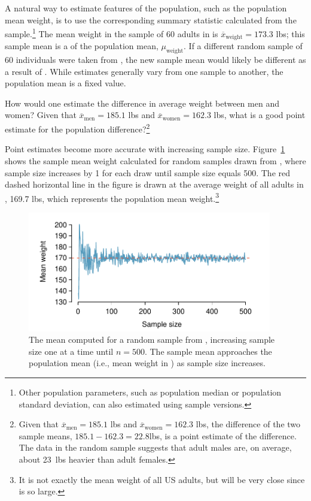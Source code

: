 A natural way to estimate features of the population, such as the population mean weight, is to use the corresponding summary statistic calculated from the sample.\footnote{Other population parameters, such as population median or population standard deviation, can also estimated using sample versions.} The mean weight in the sample of 60 adults in  is $\overline{x}_{\text{weight}} = 173.3$ lbs; this sample mean is a  of the population mean, $\mu_{\text{weight}}$. If a different random sample of 60 individuals were taken from , the new sample mean would likely be different as a result of . While estimates generally vary from one sample to another, the population mean is a fixed value.  

\begin{exercise} \label{peOfDiffWeightBetweenGender}
	How would one estimate the difference in average weight between men and women? Given that $\overline{x}_{\text{men}} = 185.1$ lbs and $\overline{x}_{\text{women}} = 162.3$ lbs, what is a good point estimate for the population difference?\footnote{Given that $\overline{x}_{\text{men}} = 185.1$ lbs and $\overline{x}_{\text{women}} = 162.3$ lbs, the difference of the two sample means, $185.1 - 162.3 = 22.8$lbs, is a point estimate of the difference. The data in the random sample suggests that adult males are, on average, about 23~lbs heavier than adult females.}
\end{exercise}

Point estimates become more accurate with increasing sample size. Figure~\ref{cdcWeightRunningMean} shows the sample mean weight calculated for random samples drawn from , where sample size increases by 1 for each draw until sample size equals 500. The red dashed horizontal line in the figure is drawn at the average weight of all adults in , 169.7 lbs, which represents the population mean weight.\footnote{It is not exactly the mean weight of all US adults, but will be very close since  is so large.}

\begin{figure}[h]
	\centering
	\includegraphics[width=0.95\textwidth]{ch_inference_foundations_oi_biostat/figures/cdcWeightRunningMean/cdcWeightRunningMeanNew.pdf}
	\caption{The mean  computed for a random sample from , increasing sample size one at a time until $n = 500$. The sample mean approaches the population mean (i.e., mean weight in ) as sample size increases.}
	\label{cdcWeightRunningMean}
\end{figure}

